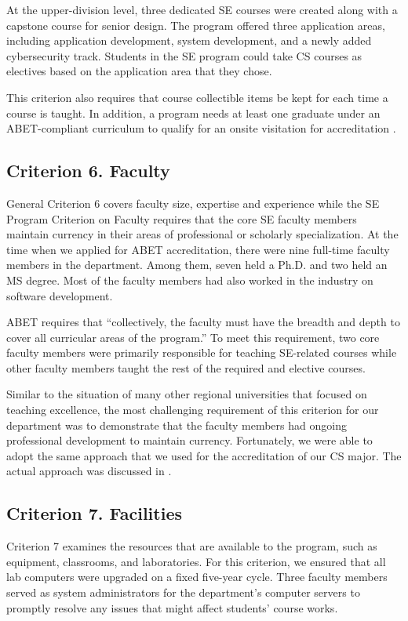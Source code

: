 \documentclass{article}
\begin{document}
At the upper-division level, three dedicated SE courses were created along with a capstone course for senior design.  The program offered three application areas, including application development, system development, and a newly added cybersecurity track.  Students in the SE program could take CS courses as electives based on the application area that they chose. 

This criterion also requires that course collectible items be kept for each time a course is taught.  In addition, a program needs at least one graduate under an ABET-compliant curriculum to qualify for an onsite visitation for accreditation \cite{fu14}.  

\subsection{Criterion 6. Faculty} \label{fac}
General Criterion 6 covers faculty size, expertise and experience while the SE Program Criterion on Faculty requires that the core SE faculty members maintain currency in their areas of professional or scholarly specialization.  At the time when we applied for ABET accreditation, there were nine full-time faculty members in the department.  Among them, seven held a Ph.D. and two held an MS degree. Most of the faculty members had also worked in the industry on software development.

ABET requires that ``collectively, the faculty must have the breadth and depth to cover all curricular areas of the program.''  To meet this requirement, two core faculty members were primarily responsible for teaching SE-related courses while other faculty members taught the rest of the required and elective courses.

Similar to the situation of many other regional universities that focused on teaching excellence, the most challenging requirement of this criterion for our department was to demonstrate that the faculty members had ongoing professional development to maintain currency.  Fortunately, we were able to adopt the same approach that we used for the accreditation of our CS major.  The actual approach was discussed in \cite{fu14}.

\subsection{Criterion 7. Facilities }
Criterion 7 examines the resources that are available to the program, such as equipment, classrooms, and laboratories.  For this criterion, we ensured that all lab computers were upgraded on a fixed five-year cycle.  Three faculty members served as system administrators for the department’s computer servers to promptly resolve any issues that might affect students’ course works. 
\end{document}
